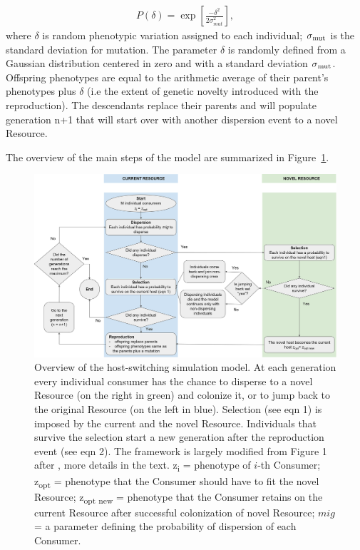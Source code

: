 \begin{gather}
 P (\delta) = \exp{[\frac{-\delta^2}{2\sigma_{mut}^2}]} ,
\end{gather}
where $\delta$ is random phenotypic variation assigned to each individual; $\sigma\textsubscript{mut}$ is the standard deviation for mutation. The parameter $\delta$ is randomly defined from a Gaussian distribution centered in zero and with a standard deviation $\sigma\textsubscript{mut}$. Offspring phenotypes are equal to the arithmetic average of their parent's phenotypes plus $\delta$ (i.e the extent of genetic novelty introduced with the reproduction).
The descendants replace their parents and will populate generation n+1 that will start over with another dispersion event to a novel Resource.

The overview of the main steps of the model are summarized in Figure~\ref{figure:model overview}.
\\
\begin{figure}[htbp]
  \centering
  \includegraphics[width=140mm,scale=0.7]{Flowchart_HSmodelDEF2.png}
  \caption{Overview of the host-switching simulation model. At each generation every individual consumer has the chance to disperse to a novel Resource (on the right in green) and colonize it, or to jump back to the original Resource (on the left in blue). Selection (see eqn 1) is imposed by the current and the novel Resource. Individuals that survive the selection start a new generation after the reproduction event (see eqn 2). The framework is largely modified from Figure 1 after \citet{araujo_understanding_2015}, more details in the text.
  z\textsubscript{i} = phenotype of $i$-th Consumer;
  z\textsubscript{opt} =  phenotype that the Consumer should have to fit the novel Resource;
  z\textsubscript{opt new} =  phenotype that the Consumer retains on the current Resource after successful colonization of novel Resource;
  $mig$ = a parameter defining the probability of dispersion of each Consumer.}
  \label{figure:model overview}
\end{figure}

